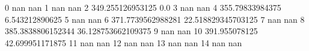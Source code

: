 0 nan nan
1 nan nan
2 349.255126953125 0.0
3 nan nan
4 355.79833984375 6.543212890625
5 nan nan
6 371.7739562988281 22.518829345703125
7 nan nan
8 385.3838806152344 36.128753662109375
9 nan nan
10 391.955078125 42.699951171875
11 nan nan
12 nan nan
13 nan nan
14 nan nan

